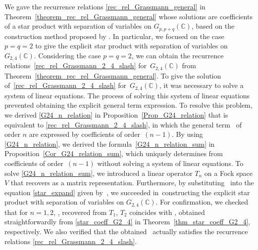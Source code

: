 \documentclass[10pt,a4paper]{amsart}
\numberwithin{equation}{section}
\begin{document}
We gave the recurrence relations \eqref{rec_rel_Grassmann_general} in Theorem~\ref{theorem_rec_rel_Grassmann_general} whose solutions are coefficients of a star product with separation of variables on $G_{p,p+q}(\mathbb{C})$, based on the construction method proposed by \cite{HS1,HS2}. In particular, we focused on the case $p=q=2$ to give the explicit star product with separation of variables on $G_{2,4}(\mathbb{C})$. Considering the case $p=q=2$, we can obtain the recurrence relations~\eqref{rec_rel_Grassmann_2_4_slash} for~${G_{2,4}(\mathbb{C})}$ from Theorem~\ref{theorem_rec_rel_Grassmann_general}. To give the solution of~\eqref{rec_rel_Grassmann_2_4_slash} for~$G_{2,4}(\mathbb{C})$, it was necessary to solve a system of linear equations. The process of solving this system of linear equations prevented obtaining the explicit general term expression. To resolve this problem, we derived \eqref{G24_n_relation} in Proposition~\ref{Prop_G24_relation} that is equivalent to \eqref{rec_rel_Grassmann_2_4_slash}, in which the general term~ of order $n$ are expressed by coefficients of order~${(n-1)}$.
By using \eqref{G24_n_relation}, we derived the formula~\eqref{G24_n_relation_sum} in Proposition~\ref{Cor_G24_relation_sum}, which uniquely determines  from coefficients of order~${(n-1)}$ without solving a system of linear equations.
To solve
\eqref{G24_n_relation_sum}, we introduced a linear operator $T_{n}$ on a Fock space $V$ that recovers 
as a matrix representation. Furthermore, by substituting~ into the equation \eqref{star_expand} given by~\cite{HS1,HS2}, we succeeded in~constructing the explicit star product with separation of variables on $G_{2,4}(\mathbb{C})$. For confirmation, we checked that for $n=1,2$,
,
recovered from
$
T_{1}$,
$
T_{2}
$
coincides with
,
obtained straightforwardly from \eqref{star_coeff_G2_4} in Theorem~\ref{thm_star_coeff_G2_4}, respectively. We also verified that the obtained~ actually satisfies the recurrence relations \eqref{rec_rel_Grassmann_2_4_slash}.
\end{document}
